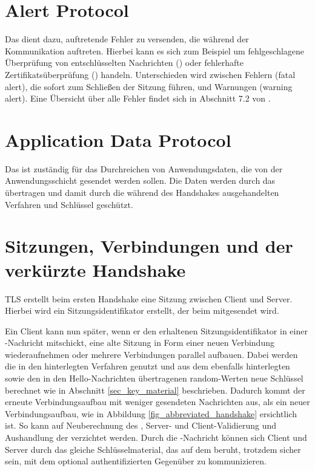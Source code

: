 \section{Alert Protocol}

Das \alertprotocol{} dient dazu, auftretende Fehler zu versenden, die während der Kommunikation auftreten. Hierbei kann es sich zum Beispiel um fehlgeschlagene Überprüfung von entschlüsselten Nachrichten (\badrecordmac{}) oder fehlerhafte Zertifikatsüberprüfung (\badcertificate{}) handeln. Unterschieden wird zwischen Fehlern (fatal alert), die sofort zum Schließen der Sitzung führen, und Warnungen (warning alert). Eine Übersicht über alle Fehler findet sich in Abschnitt 7.2 von \cite{tls12}.

\section{Application Data Protocol}

Das \applicationdataprotocol{} ist zuständig für das Durchreichen von Anwendungsdaten, die von der Anwendungsschicht gesendet werden sollen. Die Daten werden durch das \recordprotocol{} übertragen und damit durch die während des Handshakes ausgehandelten Verfahren und Schlüssel geschützt.

\section{Sitzungen, Verbindungen und der verkürzte Handshake}
\label{sec_session_connection}


TLS erstellt beim ersten Handshake eine Sitzung zwischen Client und Server. Hierbei wird ein Sitzungsidentifikator erstellt, der beim \serverhello{} mitgesendet wird. 

Ein Client kann nun später, wenn er den erhaltenen Sitzungsidentifikator in einer \clienthello{}-Nachricht mitschickt, eine alte Sitzung in Form einer neuen Verbindung wiederaufnehmen oder mehrere Verbindungen parallel aufbauen. Dabei werden die in den  hinterlegten Verfahren genutzt und aus dem ebenfalls hinterlegten \mastersecret{} sowie den in den Hello-Nachrichten übertragenen random-Werten neue Schlüssel berechnet wie in Abschnitt \ref{sec_key_material} beschrieben. Dadurch kommt der erneute Verbindungsaufbau mit weniger gesendeten Nachrichten aus, als ein neuer Verbindungsaufbau, wie in Abbildung \ref{fig_abbreviated_handshake} ersichtlich ist. So kann auf Neuberechnung des \mastersecret{}, Server- und Client-Validierung und Aushandlung der \ciphersuite{} verzichtet werden. Durch die \finished{}-Nachricht können sich Client und Server durch das gleiche Schlüsselmaterial, das auf dem \mastersecret{} beruht, trotzdem sicher sein, mit dem optional authentifizierten Gegenüber zu kommunizieren.

